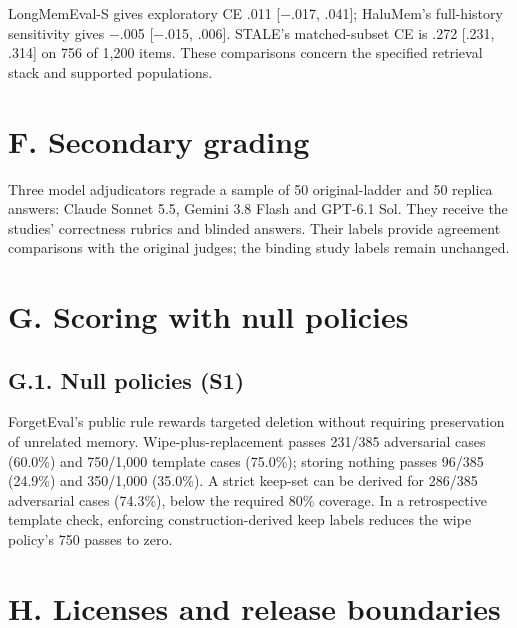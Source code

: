 \documentclass[11pt]{article}
\begin{document}
LongMemEval-S gives exploratory CE .011 {[}−.017, .041{]}; HaluMem's full-history sensitivity gives −.005 {[}−.015, .006{]}. STALE's matched-subset CE is .272 {[}.231, .314{]} on 756 of 1,200 items. These comparisons concern the specified retrieval stack and supported populations.

\label{appendix-f}

\section{F. Secondary grading}\label{f.-secondary-grading}

Three model adjudicators regrade a sample of 50 original-ladder and 50 replica answers: Claude Sonnet 5.5, Gemini 3.8 Flash and GPT-6.1 Sol. They receive the studies' correctness rubrics and blinded answers. Their labels provide agreement comparisons with the original judges; the binding study labels remain unchanged.

\label{appendix-g}

\section{G. Scoring with null policies}\label{g.-scoring-with-null-policies}

\subsection{G.1. Null policies (S1)}\label{g.1.-null-policies-s1}

ForgetEval's public rule rewards targeted deletion without requiring preservation of unrelated memory. Wipe-plus-replacement passes 231/\allowbreak{}385 adversarial cases (60.0\%) and 750/\allowbreak{}1,000 template cases (75.0\%); storing nothing passes 96/\allowbreak{}385 (24.9\%) and 350/\allowbreak{}1,000 (35.0\%). A strict keep-set can be derived for 286/\allowbreak{}385 adversarial cases (74.3\%), below the required 80\% coverage. In a retrospective template check, enforcing construction-derived keep labels reduces the wipe policy's 750 passes to zero.

\label{appendix-h}

\section{H. Licenses and release boundaries}\label{h.-licenses-and-release-boundaries}
\end{document}
